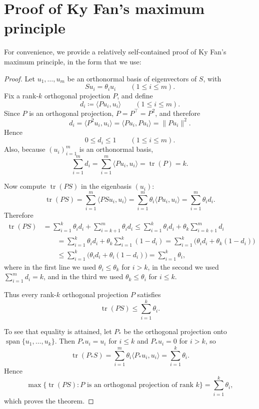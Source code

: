 \documentclass[twoside, reqno]{amsart}
\theoremstyle{definition}
\theoremstyle{remark}
\begin{document}
\newpage\appendix 
\section{Proof of Ky Fan's maximum principle} \label{sec:A}
For convenience, we provide a relatively self-contained proof of Ky Fan's 
maximum principle, in the form that we use:
\kyfan*   
\begin{proof}
Let $u_1,\dots,u_m$ be an orthonormal basis of eigenvectors of $S$,
with
\[
Su_i=\theta_i u_i\qquad (1\le i\le m).
\]
Fix a rank-$k$ orthogonal projection $P$, and define
\[
d_i\coloneqq\langle Pu_i,u_i\rangle \qquad (1\le i\le m).
\]
Since $P$ is an orthogonal projection, $P=P^\top=P^2$, and therefore
\[
d_i=\langle P^2u_i,u_i\rangle=\langle Pu_i,Pu_i\rangle=\|Pu_i\|^2.
\]
Hence
\[
0\le d_i\le 1 \qquad (1\le i\le m).
\]
Also, because $(u_i)_{i=1}^m$ is an orthonormal basis,
\[
\sum_{i=1}^m d_i
=\sum_{i=1}^m \langle Pu_i,u_i\rangle
=\operatorname{tr}(P)
=k.
\]

Now compute $\operatorname{tr}(PS)$ in the eigenbasis $(u_i)$:
\[
\operatorname{tr}(PS)
=\sum_{i=1}^m \langle PSu_i,u_i\rangle
=\sum_{i=1}^m \theta_i \langle Pu_i,u_i\rangle
=\sum_{i=1}^m \theta_i d_i.
\]
Therefore
\begin{align*}
\operatorname{tr}(PS)
&=\sum_{i=1}^k \theta_i d_i+\sum_{i=k+1}^m \theta_i d_i
\le\sum_{i=1}^k \theta_i d_i+\theta_k\sum_{i=k+1}^m d_i\\
&\qquad=\sum_{i=1}^k \theta_i d_i+\theta_k\sum_{i=1}^k(1-d_i)
=\sum_{i=1}^k \bigl(\theta_i d_i+\theta_k(1-d_i)\bigr)\\
&\qquad\le\sum_{i=1}^k \bigl(\theta_i d_i+\theta_i(1-d_i)\bigr)
=\sum_{i=1}^k \theta_i,
\end{align*}
where in the first line we used $\theta_i\le \theta_k$ for $i>k$, in the
second we used $\sum_{i=1}^m d_i=k$, and in the third we used
$\theta_k\le \theta_i$ for $i\le k$.

Thus every rank-$k$ orthogonal projection $P$ satisfies
\[
\operatorname{tr}(PS)\le \sum_{i=1}^k \theta_i.
\]

To see that equality is attained, let $P_*$ be the orthogonal
projection onto $\operatorname{span}\{u_1,\dots,u_k\}$. Then
$P_*u_i=u_i$ for $i\le k$ and $P_*u_i=0$ for $i>k$, so
\[
\operatorname{tr}(P_*S)
=\sum_{i=1}^m \theta_i \langle P_*u_i,u_i\rangle
=\sum_{i=1}^k \theta_i.
\]
Hence
\[
\max\bigl\{\operatorname{tr}(PS): P \text{ is an orthogonal projection of rank }k\bigr\}
=\sum_{i=1}^k \theta_i,
\]
which proves the theorem.
\end{proof}
\end{document}
